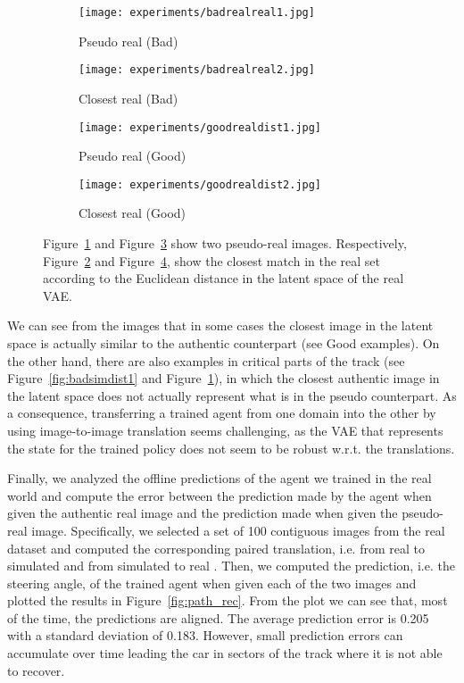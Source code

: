 \begin{figure}[h]
  \centering
  \begin{subfigure}{.24\linewidth}
	      \centering
	      \texttt{[image: experiments/badrealreal1.jpg]}
	      \caption{Pseudo real (Bad)}\label{fig:badrealdist1}
	  \end{subfigure}%
  \hfill
  \begin{subfigure}{.24\linewidth}
	    \centering
	    \texttt{[image: experiments/badrealreal2.jpg]}
	    \caption{Closest real (Bad)}\label{fig:badrealdist2}
	  \end{subfigure}%
  \hfill
  \begin{subfigure}{.24\linewidth}
	      \centering
	      \texttt{[image: experiments/goodrealdist1.jpg]}
	      \caption{Pseudo real (Good)}\label{fig:goodrealdist1}
	  \end{subfigure}%
  \hfill
  \begin{subfigure}{.24\linewidth}
	    \centering
	    \texttt{[image: experiments/goodrealdist2.jpg]}
	    \caption{Closest real (Good)}\label{fig:goodrealdist2}
	\end{subfigure}
	  \caption{Figure~\ref{fig:badrealdist1} and Figure~\ref{fig:goodrealdist1} show two pseudo-real images. Respectively, Figure~\ref{fig:badrealdist2} and Figure~\ref{fig:goodrealdist2}, show the closest match in the real set according to the Euclidean distance in the latent space of the real VAE.}
	  \label{fig:realdistance}
\end{figure}

We can see from the images that in some cases the closest image in the latent space is actually similar to the authentic counterpart (see Good examples). On the other hand, there are also examples in critical parts of the track (see Figure~\ref{fig:badsimdist1} and Figure~\ref{fig:badrealdist1}), in which the closest authentic image in the latent space does not actually represent what is in the pseudo counterpart. As a consequence, transferring a trained agent from one domain into the other by using image-to-image translation seems challenging, as the VAE that represents the state for the trained policy does not seem to be robust w.r.t. the translations.

Finally, we analyzed the offline predictions of the agent we trained in the real world and compute the error between the prediction made by the agent when given the authentic real image and the prediction made when given the pseudo-real image. Specifically, we selected a set of 100 contiguous images from the real dataset and computed the corresponding paired translation, i.e. from real to simulated and from simulated to real . Then, we computed the prediction, i.e. the steering angle, of the trained agent when given each of the two images and plotted the results in Figure~\ref{fig:path_rec}. From the plot we can see that, most of the time, the predictions are aligned. The average prediction error is 0.205 with a standard deviation of 0.183. However, small prediction errors can accumulate over time leading the car in sectors of the track where it is not able to recover.

